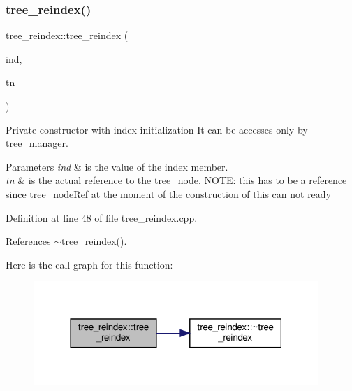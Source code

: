 \subsubsection{\texorpdfstring{tree\+\_\+reindex()}{tree\_reindex()}}
{\footnotesize\ttfamily tree\+\_\+reindex\+::tree\+\_\+reindex (\begin{DoxyParamCaption}\item[{const unsigned int}]{ind,  }\item[{const \hyperlink{tree__node_8hpp_a6ee377554d1c4871ad66a337eaa67fd5}{tree\+\_\+node\+Ref} \&}]{tn }\end{DoxyParamCaption})\hspace{0.3cm}{\ttfamily [private]}}



Private constructor with index initialization It can be accesses only by \hyperlink{classtree__manager}{tree\+\_\+manager}. 


\begin{DoxyParams}{Parameters}
{\em ind} & is the value of the index member. \\
\hline
{\em tn} & is the actual reference to the \hyperlink{classtree__node}{tree\+\_\+node}. N\+O\+TE\+: this has to be a reference since tree\+\_\+node\+Ref at the moment of the construction of this can not ready \\
\hline
\end{DoxyParams}


Definition at line 48 of file tree\+\_\+reindex.\+cpp.



References $\sim$tree\+\_\+reindex().

Here is the call graph for this function\+:
\nopagebreak
\begin{figure}[H]
\begin{center}
\leavevmode
\includegraphics[width=306pt]{dd/d99/classtree__reindex_abdb9b71762bed3ddce4d63a800be428f_cgraph}
\end{center}
\end{figure}
\mbox{\label{classtree__reindex_a06ddb155c756efea3cafb985519fb2cf}} 

